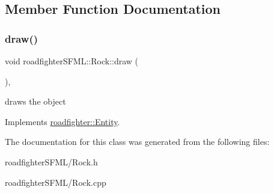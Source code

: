 \subsection{Member Function Documentation}
\mbox{\label{classroadfighterSFML_1_1Rock_a7416f3e77114d38994d0de4d78e9f403}} 
\subsubsection{\texorpdfstring{draw()}{draw()}}
{\footnotesize\ttfamily void roadfighter\+S\+F\+M\+L\+::\+Rock\+::draw (\begin{DoxyParamCaption}{ }\end{DoxyParamCaption})\hspace{0.3cm}{\ttfamily [override]}, {\ttfamily [virtual]}}

draws the object 

Implements \hyperlink{classroadfighter_1_1Entity_ac516f8005f969ad5a86c252e5a3640ee}{roadfighter\+::\+Entity}.



The documentation for this class was generated from the following files\+:\begin{DoxyCompactItemize}
\item 
roadfighter\+S\+F\+M\+L/Rock.\+h\item 
roadfighter\+S\+F\+M\+L/Rock.\+cpp\end{DoxyCompactItemize}
